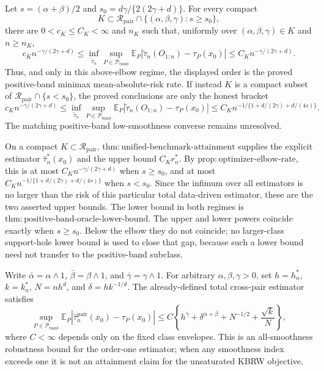 Let \(s=(\alpha+\beta)/2\) and \(s_0=d\gamma/\{2(2\gamma+d)\}\).  For every compact
\[
 K\subset\mathcal R_{\mathrm{pair}}\cap\{(\alpha,\beta,\gamma):s\geq s_0\},
\]
there are \(0<c_K\leq C_K<\infty\) and \(n_K\) such that, uniformly over \((\alpha,\beta,\gamma)\in K\) and \(n\geq n_K\),
\[
 c_Kn^{-\gamma/(2\gamma+d)}
 \leq
 \inf_{\widetilde\tau_n}\sup_{P\in\mathcal P_{\mathrm{band}}}
 \mathbb E_P|\widetilde\tau_n(O_{1:n})-\tau_P(x_0)|
 \leq C_Kn^{-\gamma/(2\gamma+d)}.
\]
Thus, and only in this above-elbow regime, the displayed order is the proved positive-band minimax mean-absolute-risk rate.  If instead \(K\) is a compact subset of \(\mathcal R_{\mathrm{pair}}\cap\{s<s_0\}\), the proved conclusions are only the honest bracket
\[
 c_Kn^{-\gamma/(2\gamma+d)}
 \leq
 \inf_{\widetilde\tau_n}\sup_{P\in\mathcal P_{\mathrm{band}}}
 \mathbb E_P|\widetilde\tau_n(O_{1:n})-\tau_P(x_0)|
 \leq C_Kn^{-1/\{1+d/(2\gamma)+d/(4s)\}}.
\]
The matching positive-band low-smoothness converse remains unresolved.

On a compact \(K\subset\mathcal R_{\mathrm{pair}}\), \(\mathrm{thm:unified\mbox{-}benchmark\mbox{-}attainment}\) supplies the explicit estimator \(\widehat\tau_n^*(x_0)\) and the upper bound \(C_Kr_n^*\).  By \(\mathrm{prop:optimizer\mbox{-}elbow\mbox{-}rate}\), this is at most \(C_Kn^{-\gamma/(2\gamma+d)}\) when \(s\geq s_0\), and at most \(C_Kn^{-1/\{1+d/(2\gamma)+d/(4s)\}}\) when \(s<s_0\).  Since the infimum over all estimators is no larger than the risk of this particular total data-driven estimator, these are the two asserted upper bounds.  The lower bound in both regimes is \(\mathrm{thm:positive\mbox{-}band\mbox{-}oracle\mbox{-}lower\mbox{-}bound}\).  The upper and lower powers coincide exactly when \(s\geq s_0\).  Below the elbow they do not coincide; no larger-class support-hole lower bound is used to close that gap, because such a lower bound need not transfer to the positive-band subclass.

Write \(\bar\alpha=\alpha\wedge1\), \(\bar\beta=\beta\wedge1\), and \(\bar\gamma=\gamma\wedge1\).  For arbitrary \(\alpha,\beta,\gamma>0\), set \(h=h_n^*\), \(k=k_n^*\), \(N=nh^d\), and \(\delta=hk^{-1/d}\).  The already-defined total cross-pair estimator satisfies
\[
 \sup_{P\in\mathcal P_{\mathrm{band}}}
 \mathbb E_P\left|\widehat\tau_n^{\mathrm{pair}}(x_0)-\tau_P(x_0)\right|
 \leq C\left\{h^{\bar\gamma}+\delta^{\bar\alpha+\bar\beta}+N^{-1/2}+\frac{\sqrt{k}}{N}\right\},
\]
where \(C<\infty\) depends only on the fixed class envelopes.  This is an all-smoothness robustness bound for the order-one estimator; when any smoothness index exceeds one it is not an attainment claim for the unsaturated KBRW objective.

